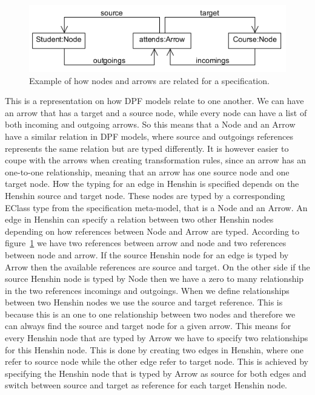 \begin{figure}[H] 
	\centering
	\includegraphics[scale=0.8]{./Figures/arrow_node_relate.png}
	\caption[Relationship between node and arrow in DPF]
	{Example of how nodes and arrows are related for a specification.}
	\label{fig:arrow_node_relate}
\end{figure}

This is a representation on how DPF models relate to one another. We can have an
arrow that has a target and a source node, while every node can have a list of
both incoming and outgoing arrows. So this means that a Node and an Arrow have a
similar relation in DPF models, where source and outgoings references represents
the same relation but are typed differently. It is however easier to coupe with
the arrows when creating transformation rules, since an arrow has an
one-to-one relationship, meaning that an arrow has one source node and one
target node. How the typing for an edge in Henshin is specified depends on the
Henshin source and target node. These nodes are typed by a corresponding EClass
type from the specification meta-model, that is a Node and an Arrow. An edge in
Henshin can specify a relation between two other Henshin
nodes depending on how references between Node and Arrow are typed. According to
figure~\ref{fig:arrow_node_relate} we have two references between arrow and
node and two references between node and arrow. If the source Henshin node for
an edge is typed by Arrow then the available references are source and target.
On the other side if the source Henshin node is typed by Node then we have a
zero to many relationship in the two references incomings and outgoings. When we
define relationships between two Henshin nodes we use the source and target
reference. This is because this is an one to one relationship between two nodes
and therefore we can always find the source and target node for a given arrow.
This means for every Henshin node that are typed by Arrow we have to specify two
relationships for this Henshin node. This is done by creating two edges in
Henshin, where one refer to source node while the other edge refer to
target node. This is achieved by specifying the Henshin node that is typed by
Arrow as source for both edges and switch between source and target as reference
for each target Henshin node. 

